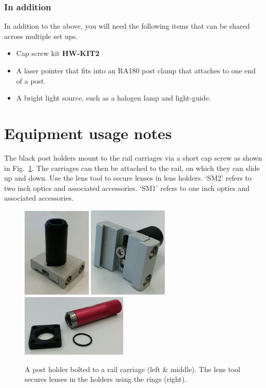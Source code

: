 \documentclass[a4paper]{report}
\begin{document}
\subsubsection{In addition}
In addition to the above, you will need the following items that can be shared across multiple set ups.
\begin{itemize}
\setlength\itemsep{0.1em}
\item Cap screw kit \textbf{HW-KIT2}
\item A laser pointer that fits into an RA180 post clamp that attaches to one end of a post.
\item A bright light source, such as a halogen lamp and light-guide. 
\end{itemize}

\section{Equipment usage notes}
The black post holders mount to the rail carriages via a short cap screw as shown in Fig.~\ref{fig:post}. 
The carriages can then be attached to the rail, on which they can slide up and down. 
Use the lens tool to secure lenses in lens holders. 
`SM2' refers to two inch optics and associated accessories. 
`SM1' refers to one inch optics and associated accessories. 

\begin{figure}[h]
\center
\includegraphics[width=1.3in]{post_mounted.eps}
\includegraphics[width=1.5in]{post_mounted_underside.eps}
\includegraphics[width=2in]{lens_tool.eps}
\caption{A post holder bolted to a rail carriage (left \& middle).
The lens tool secures lenses in the holders using the rings (right).}
\label{fig:post}
\end{figure}
\end{document}
